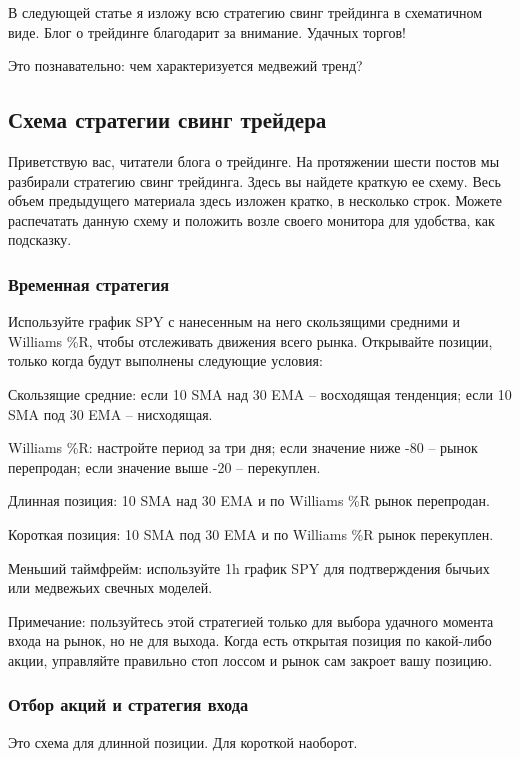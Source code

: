 \documentclass{book}
\begin{document}
В следующей статье я изложу всю стратегию свинг трейдинга в схематичном виде. Блог о трейдинге благодарит за внимание. Удачных торгов!


Это познавательно: чем характеризуется медвежий тренд?

\subsection{Схема стратегии свинг трейдера}

Приветствую вас, читатели блога о трейдинге. На протяжении шести
постов мы разбирали стратегию свинг трейдинга. Здесь вы найдете
краткую ее схему. Весь объем предыдущего материала здесь изложен
кратко, в несколько строк. Можете распечатать данную схему и положить
возле своего монитора для удобства, как подсказку.

\subsubsection{Временная стратегия}

Используйте график SPY с нанесенным на него скользящими средними и Williams \%R, чтобы отслеживать движения всего рынка. Открывайте позиции, только когда будут выполнены следующие условия:

Скользящие средние: если 10 SMA над 30 EMA – восходящая тенденция; если 10 SMA под 30 EMA – нисходящая.

Williams \%R: настройте период за три дня; если значение ниже -80 – рынок перепродан; если значение выше -20 – перекуплен.

Длинная позиция: 10 SMA над 30 EMA и по Williams \%R рынок перепродан.

Короткая позиция: 10 SMA под 30 EMA и по Williams \%R рынок перекуплен.

Меньший таймфрейм: используйте 1h график SPY для подтверждения бычьих или медвежьих свечных моделей.

Примечание: пользуйтесь этой стратегией только для выбора удачного
момента входа на рынок, но не для выхода. Когда есть открытая позиция
по какой-либо акции, управляйте правильно стоп лоссом и рынок сам
закроет вашу позицию.

\subsubsection{Отбор акций и стратегия входа}

Это схема для длинной позиции. Для короткой наоборот.
\end{document}
